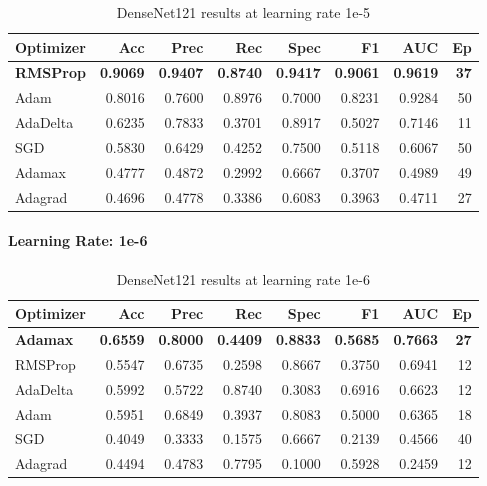 \begingroup
\tiny
\setlength{\tabcolsep}{2.5pt}
\begin{table}[H]
  \centering
  \caption{DenseNet121 results at learning rate 1e-5}
  \label{tab:densenet121-1e5}
  \begin{tabular}{l r r r r r r r}
    \toprule
    \rowcolor{tableheader}
    \textbf{Optimizer} & \textbf{Acc} & \textbf{Prec} & \textbf{Rec} &
    \textbf{Spec} & \textbf{F1} & \textbf{AUC} & \textbf{Ep} \\
    \midrule
    \textbf{RMSProp}  & \textbf{0.9069} & \textbf{0.9407} & \textbf{0.8740} & \textbf{0.9417} & \textbf{0.9061} & \textbf{0.9619} & \textbf{37} \\
    Adam     & 0.8016 & 0.7600 & 0.8976 & 0.7000 & 0.8231 & 0.9284 & 50 \\
    AdaDelta & 0.6235 & 0.7833 & 0.3701 & 0.8917 & 0.5027 & 0.7146 & 11 \\
    SGD      & 0.5830 & 0.6429 & 0.4252 & 0.7500 & 0.5118 & 0.6067 & 50 \\
    Adamax   & 0.4777 & 0.4872 & 0.2992 & 0.6667 & 0.3707 & 0.4989 & 49 \\
    Adagrad  & 0.4696 & 0.4778 & 0.3386 & 0.6083 & 0.3963 & 0.4711 & 27 \\
    \bottomrule
  \end{tabular}
\end{table}
\endgroup

\paragraph{Learning Rate: 1e-6}

\begingroup
\tiny
\setlength{\tabcolsep}{2.5pt}
\begin{table}[H]
  \centering
  \caption{DenseNet121 results at learning rate 1e-6}
  \label{tab:densenet121-1e6}
  \begin{tabular}{l r r r r r r r}
    \toprule
    \rowcolor{tableheader}
    \textbf{Optimizer} & \textbf{Acc} & \textbf{Prec} & \textbf{Rec} &
    \textbf{Spec} & \textbf{F1} & \textbf{AUC} & \textbf{Ep} \\
    \midrule
    \textbf{Adamax}   & \textbf{0.6559} & \textbf{0.8000} & \textbf{0.4409} & \textbf{0.8833} & \textbf{0.5685} & \textbf{0.7663} & \textbf{27} \\
    RMSProp  & 0.5547 & 0.6735 & 0.2598 & 0.8667 & 0.3750 & 0.6941 & 12 \\
    AdaDelta & 0.5992 & 0.5722 & 0.8740 & 0.3083 & 0.6916 & 0.6623 & 12 \\
    Adam     & 0.5951 & 0.6849 & 0.3937 & 0.8083 & 0.5000 & 0.6365 & 18 \\
    SGD      & 0.4049 & 0.3333 & 0.1575 & 0.6667 & 0.2139 & 0.4566 & 40 \\
    Adagrad  & 0.4494 & 0.4783 & 0.7795 & 0.1000 & 0.5928 & 0.2459 & 12 \\
    \bottomrule
  \end{tabular}
\end{table}
\endgroup

